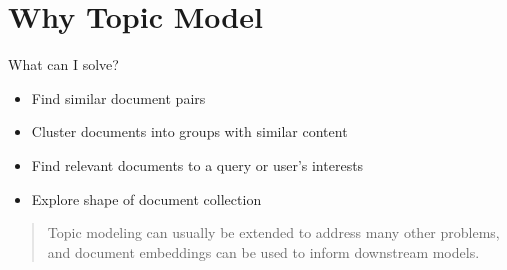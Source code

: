 \documentclass[10pt]{beamer}
\begin{document}
\section{Why Topic Model}
\begin{frame}{What can I solve?}
  \begin{itemize}
  \item Find similar document pairs
  \item Cluster documents into groups with similar content
  \item Find relevant documents to a query or user's interests
  \item Explore shape of document collection
  \end{itemize}

  \begin{quote}
    Topic modeling can usually be extended to address many other problems, and document embeddings can be used to inform downstream models.
  \end{quote}
\end{frame}
\end{document}
